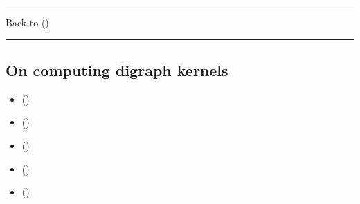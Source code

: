 \documentclass[a4paper,12pt,english]{sphinxhowto}
\begin{document}
\bigskip\hrule\bigskip


\sphinxAtStartPar
Back to {\hyperref[\detokenize{pearls:pearls-label}]{}} ()


\bigskip\hrule\bigskip



\subsection{On computing digraph kernels}
\label{\detokenize{pearls:on-computing-digraph-kernels}}\label{\detokenize{pearls:kernel-tutorial-label}}
\begin{sphinxcontents}
\begin{itemize}
\item {} 
\sphinxAtStartPar
{}\label{\detokenize{pearls:id190}}{\hyperref[\detokenize{pearls:what-is-a-graph-kernel}]{}} ()

\item {} 
\sphinxAtStartPar
{}\label{\detokenize{pearls:id191}}{\hyperref[\detokenize{pearls:initial-and-terminal-kernels}]{}} ()

\item {} 
\sphinxAtStartPar
{}\label{\detokenize{pearls:id192}}{\hyperref[\detokenize{pearls:kernels-in-lateralized-digraphs}]{}} ()

\item {} 
\sphinxAtStartPar
{}\label{\detokenize{pearls:id193}}{\hyperref[\detokenize{pearls:computing-first-and-last-choice-recommendations}]{}} ()

\item {} 
\sphinxAtStartPar
{}\label{\detokenize{pearls:id194}}{\hyperref[\detokenize{pearls:tractability}]{}} ()

\end{itemize}
\end{sphinxcontents}
\end{document}
